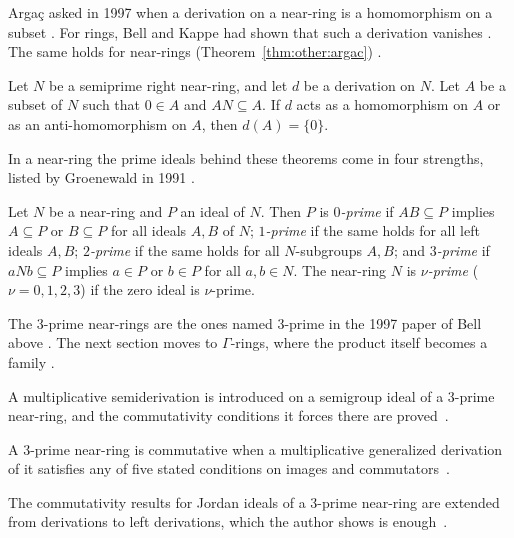 Arga\c{c} asked in 1997 when a derivation on a near-ring is a homomorphism
on a subset \cite[p.~737]{Argac1997}. For rings, Bell and Kappe had shown
that such a derivation
vanishes \cite[p.~737]{Argac1997}. The same holds for near-rings (Theorem~\ref{thm:other:argac})
\cite[p.~737]{Argac1997}.\begin{theorem}\label{thm:other:argac}
Let $N$ be a semiprime right near-ring, and let $d$ be a derivation on $N$.
Let $A$ be a subset of $N$ such that $0 \in A$ and $A N \subseteq A$. If $d$
acts as a homomorphism on $A$ or as an anti-homomorphism on $A$, then
$d(A) = \{0\}$.
\end{theorem}

In a near-ring the prime ideals behind these theorems come in four
strengths, listed by Groenewald in 1991
\cite[Definition~1, p.~2669]{Groenewald1991}.

\begin{definition}\label{def:other:prime-ideals}
Let $N$ be a near-ring and $P$ an ideal of $N$. Then $P$ is
\emph{$0$-prime} if $A B \subseteq P$ implies $A \subseteq P$ or
$B \subseteq P$ for all ideals $A, B$ of $N$; \emph{$1$-prime} if the same
holds for all left ideals $A, B$; \emph{$2$-prime} if the same holds for
all $N$-subgroups $A, B$; and \emph{$3$-prime} if $a N b \subseteq P$
implies $a \in P$ or $b \in P$ for all $a, b \in N$. The near-ring $N$ is
\emph{$\nu$-prime} ($\nu = 0, 1, 2, 3$) if the zero ideal is $\nu$-prime.
\end{definition}

The $3$-prime near-rings are the ones named 3-prime in the 1997 paper of
Bell above \cite[p.~191]{Bell1997II}. The next section moves to
$\Gamma$-rings, where the product itself becomes a family
\cite[p.~2]{DeyPaulRakhimov2012}.

A multiplicative semiderivation is introduced on a semigroup ideal of a 3-prime near-ring, and the commutativity conditions it forces there are proved~\cite{WlSemigroupIdealsWith2022}.

A 3-prime near-ring is commutative when a multiplicative generalized derivation of it satisfies any of five stated conditions on images and commutators~\cite{WlOnCommutativityOf2019}.

The commutativity results for Jordan ideals of a 3-prime near-ring are extended from derivations to left derivations, which the author shows is enough~\cite{WlOnJordanIdeals2023}.

